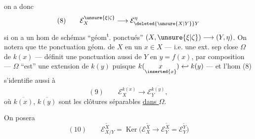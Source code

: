 
on a donc
\[
(8)\qquad \mathcal E_X^{\unsure{\xi|\zeta}}\longrightarrow\mathcal E_{\deleted{\unsure{X|Y}}Y}^{\eta}
\]
si on a un hom de schémas ``géom\textsuperscript{t}. ponctués'' $(X,\unsure{\xi|\zeta})\longrightarrow(Y,\eta)$. On notera que tte ponctuation géom. de $X$ en un $x\in X$ --- i.e. une ext. sep close $\Omega$ de $k(x)$ --- définit  une ponctuation  aussi de $Y$ en $y=f(x)$,  par composition --- $\Omega$ ``est'' une extension de $k(y)$ puisque $k(\underset{\inserted{x}}{x})\hookleftarrow k(y)$ --- et l'hom (8) s'identifie aussi à
\[
(9)\qquad \mathcal E_X^{\overline{k(x)}}\longrightarrow\mathcal E_Y^{\overline{k(y)}},
\]
où $\overline{k(x)}$, $\overline{k(y)}$ sont les clôtures séparables \uline{dans $\Omega$}.

On posera
\[
(10)\qquad \mathcal E_{X/Y}^{\widetilde X}=\operatorname{Ker}\bigl(\mathcal E_X^{\widetilde X}\longrightarrow\mathcal E_Y^{\widetilde X}=\mathcal E_Y^{\widetilde Y}\bigr)
\]

